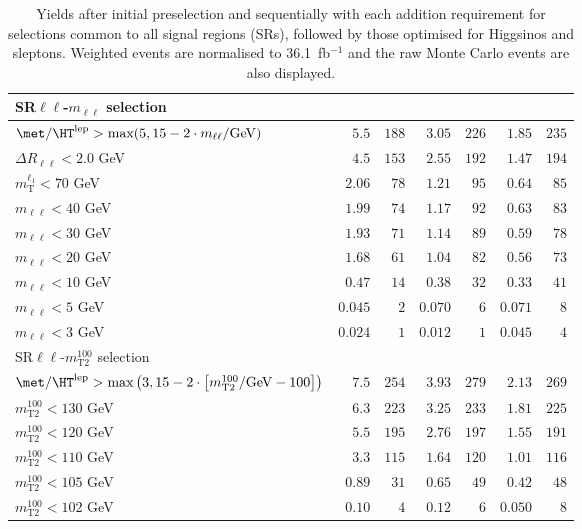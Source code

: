 \begin{table}
\begin{center}
\begin{tabular*}{\textwidth}{@{\extracolsep{\fill}}lrrrrrr}
\midrule
SR$\ell\ell$-$m_{\ell\ell}$ selection &  &  & \\ 
\midrule
$\met / \HT^\text{lep} > \text{max}(5, 15-2\cdot m_{\ell\ell}/\text{GeV})$ & $5.5$ & $188$    & $3.05$ & $226$    & $1.85$ & $235$   \\ 
    $\Delta R_{\ell\ell} < 2.0$ GeV & $4.5$ & $153$    & $2.55$ & $192$    & $1.47$ & $194$   \\ 
    $m_\text{T}^{\ell_1} < 70$ GeV & $2.06$ & $78$    & $1.21$ & $95$    & $0.64$ & $85$   \\ 
    $m_{\ell\ell} < 40$ GeV & $1.99$ & $74$    & $1.17$ & $92$    & $0.63$ & $83$   \\ 
    $m_{\ell\ell} < 30$ GeV & $1.93$ & $71$    & $1.14$ & $89$    & $0.59$ & $78$   \\ 
    $m_{\ell\ell} < 20$ GeV & $1.68$ & $61$    & $1.04$ & $82$    & $0.56$ & $73$   \\ 
    $m_{\ell\ell} < 10$ GeV & $0.47$ & $14$    & $0.38$ & $32$    & $0.33$ & $41$   \\ 
    $m_{\ell\ell} < 5$ GeV & $0.045$ & $2$    & $0.070$ & $6$    & $0.071$ & $8$   \\ 
    $m_{\ell\ell} < 3$ GeV & $0.024$ & $1$    & $0.012$ & $1$    & $0.045$ & $4$   \\ 
    \midrule
SR$\ell\ell$-$m_\text{T2}^{100}$ selection &  &  & \\ 
\midrule
$\met / \HT^\text{lep} > \text{max}\left(3, 15-2\cdot \left[m_\text{T2}^{100}/\text{GeV} - 100\right]\right)$ & $7.5$ & $254$    & $3.93$ & $279$    & $2.13$ & $269$   \\ 
    $m_\text{T2}^{100} < 130$ GeV & $6.3$ & $223$    & $3.25$ & $233$    & $1.81$ & $225$   \\ 
    $m_\text{T2}^{100} < 120$ GeV & $5.5$ & $195$    & $2.76$ & $197$    & $1.55$ & $191$   \\ 
    $m_\text{T2}^{100} < 110$ GeV & $3.3$ & $115$    & $1.64$ & $120$    & $1.01$ & $116$   \\ 
    $m_\text{T2}^{100} < 105$ GeV & $0.89$ & $31$    & $0.65$ & $49$    & $0.42$ & $48$   \\ 
    $m_\text{T2}^{100} < 102$ GeV & $0.10$ & $4$    & $0.12$ & $6$    & $0.050$ & $8$   \\ 
    
  \bottomrule
  \end{tabular*}
\end{center}
\caption{ Yields after initial preselection and sequentially with each addition requirement 
for selections common to all signal regions (SRs), 
followed by those optimised for Higgsinos and sleptons. 
Weighted events are normalised to 36.1~fb$^{-1}$ and the raw Monte Carlo events are also displayed.
}
\label{tab:cutflow_NUHM2}
\end{table} 
  